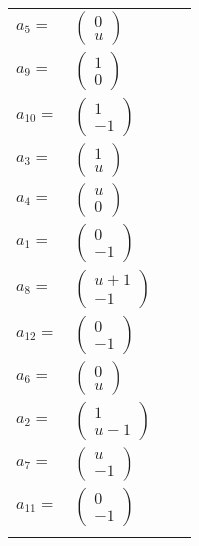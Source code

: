\documentclass[1p]{elsarticle_modified}
\theoremstyle{definition}
\begin{document}
\begin{tabular}{m{7pt} m{180pt} m{7pt} m{180pt} }
\flushright $a_{5}=$&$\begin{pmatrix}0\\u\end{pmatrix}$ \\
\flushright $a_{9}=$&$\begin{pmatrix}1\\0\end{pmatrix}$ \\
\flushright $a_{10}=$&$\begin{pmatrix}1\\-1\end{pmatrix}$ \\
\flushright $a_{3}=$&$\begin{pmatrix}1\\u\end{pmatrix}$ \\
\flushright $a_{4}=$&$\begin{pmatrix}u\\0\end{pmatrix}$ \\
\flushright $a_{1}=$&$\begin{pmatrix}0\\-1\end{pmatrix}$ \\
\flushright $a_{8}=$&$\begin{pmatrix}u+1\\-1\end{pmatrix}$ \\
\flushright $a_{12}=$&$\begin{pmatrix}0\\-1\end{pmatrix}$ \\
\flushright $a_{6}=$&$\begin{pmatrix}0\\u\end{pmatrix}$ \\
\flushright $a_{2}=$&$\begin{pmatrix}1\\u-1\end{pmatrix}$ \\
\flushright $a_{7}=$&$\begin{pmatrix}u\\-1\end{pmatrix}$ \\
\flushright $a_{11}=$&$\begin{pmatrix}0\\-1\end{pmatrix}$\\&\end{tabular}
\end{document}
